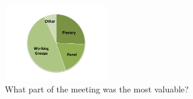 \begin{figure}[h!]
\includegraphics[width=0.4\textwidth]{figures/SurveyFig4rev}
\caption{What part of the meeting was the most valuable?
\label{fig:SFig4}}
\end{figure}


